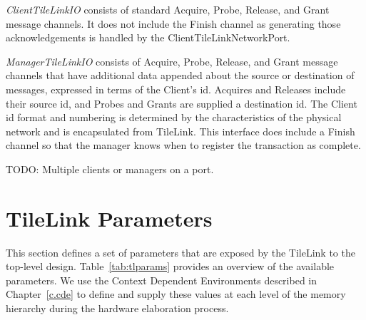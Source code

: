 {\em ClientTileLinkIO} consists of standard Acquire, Probe, Release, and Grant message channels.
It does not include the Finish channel as generating those acknowledgements is handled by the ClientTileLinkNetworkPort.

{\em ManagerTileLinkIO} consists of Acquire, Probe, Release, and Grant message channels that have additional data appended about the source or destination of messages, expressed in terms of the Client's id.
Acquires and Releases include their source id, and Probes and Grants are supplied a destination id.
The Client id format and numbering is determined by the characteristics of the physical network and is encapsulated from TileLink.
This interface does include a Finish channel so that the manager knows when to register the transaction as complete.

TODO: Multiple clients or managers on a port.

\section{TileLink Parameters}

This section defines a set of parameters that are exposed by the TileLink to the top-level design.
Table~\ref{tab:tlparams} provides an overview of the available parameters.
We use the Context Dependent Environments described in Chapter~\ref{c.cde} to define and supply these values
at each level of the memory hierarchy during the hardware elaboration process.

